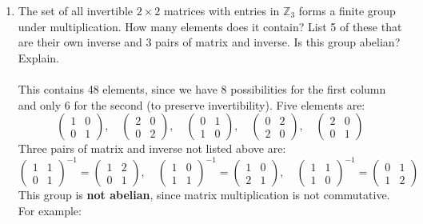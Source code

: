 \documentclass{article}
\newcommand{\Zn}[1]{\mathbb{Z}_{#1}}
\begin{document}
\begin{enumerate}
\begin{enumerate}
        \end{enumerate}
        \item The set of all invertible $ 2 \times 2$ matrices with entries in $\Zn{3}$ forms a finite group under multiplication. How many elements does it contain? List 5 of these that are their own inverse and 3 pairs of matrix and inverse. Is this group abelian? Explain.
        \\
        \\This contains 48 elements, since we have 8 possibilities for the first column and only 6 for the second (to preserve invertibility). Five elements are:
        \[\begin{pmatrix}
1&0\\0&1\end{pmatrix}, \quad \begin{pmatrix}
2&0\\0&2\end{pmatrix}, \quad \begin{pmatrix}
0&1\\1&0\end{pmatrix}, \quad \begin{pmatrix}
0&2\\2&0\end{pmatrix}, \quad \begin{pmatrix}
2&0\\0&1\end{pmatrix}\]
        Three pairs of matrix and inverse not listed above are:
        \[\begin{pmatrix}
1&1\\0&1\end{pmatrix}^{-1} = \begin{pmatrix}1&2\\0&1\end{pmatrix}, \quad \begin{pmatrix}
1&0\\1&1\end{pmatrix}^{-1} = \begin{pmatrix}1&0\\2&1\end{pmatrix}, \quad \begin{pmatrix}
1&1\\1&0\end{pmatrix}^{-1} = \begin{pmatrix}0&1\\1&2
        \end{pmatrix}\]
        This group is \textbf{not abelian}, since matrix multiplication is not commutative. For example:

\end{enumerate}
\end{document}
